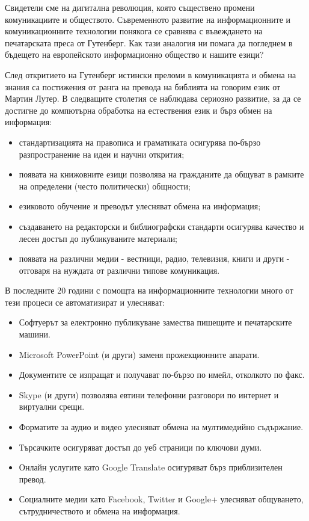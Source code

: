 \documentclass[]{../../metanetpaper}
\begin{document}
\begin{multicols}{2}

Свидетели сме на дигитална революция, която съществено промени комуникациите и обществото. Съвременното развитие на информационните и  комуникационните технологии понякога се сравнява с въвеждането на печатарската преса от Гутенберг. Как тази аналогия ни помага да погледнем в бъдещето на европейското информационно общество и нашите езици?


След откритието на Гутенберг истински преломи в комуникацията и обмена на знания са постижения от ранга на превода на библията на говорим език от Мартин Лутер. В следващите
 столетия се наблюдава сериозно развитие, за да се достигне до компютърна
обработка на естествения език и бърз обмен на информация:

\begin{itemize}
\item стандартизацията на правописа и граматиката осигурява по-бързо разпространение на идеи и научни открития;
\item появата на книжовните езици позволява на гражданите да общуват в рамките на определени  (често политически) общности;
\item езиковото обучение и преводът улесняват обмена на информация;
\item  създаването на редакторски и библиографски стандарти осигурява качество и лесен достъп до публикуваните материали;
\item появата на различни медии - вестници, радио, телевизия, книги и други - отговаря на нуждата от различни типове комуникация.
\end{itemize}

В последните 20 години с помощта на информационните технологии много от тези процеси се автоматизират и улесняват:

\begin{itemize}
\item Софтуерът за електронно публикуване замества пишещите и печатарските машини.
\item Microsoft PowerPoint (и други) заменя прожекционните апарати.
\item Документите се изпращат и получават по-бързо по имейл, отколкото по факс.
\item Skype (и други) позволява евтини телефонни разговори по интернет и виртуални срещи.
\item Форматите за аудио и видео улесняват обмена на мултимедийно съдържание.
\item Търсачките осигуряват достъп до уеб страници по ключови думи.
\item Онлайн услугите като  Google Translate  осигуряват бърз приблизителен превод.
\item Социалните медии като   Facebook,  Twitter  и  Google+   улесняват общуването, сътрудничеството и обмена на информация.
\end{itemize}


\end{multicols}
\end{document}
